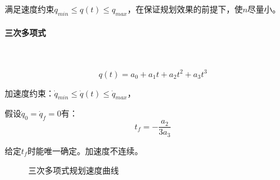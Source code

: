 \documentclass[
12pt, %
a4paper, 
oneside, %
headinclude,footinclude, %
]{scrartcl}
\begin{document}
满足速度约束$ q_{min} \leq q(t) \leq q_{max} $，在保证规划效果的前提下，使$ n $尽量小。
\paragraph{三次多项式}~\\
\begin{minipage}{0.6\textwidth}
$$ q(t) = a_0 + a_1 t + a_2 t^2 + a_3 t^3 $$

\hspace{2em}
加速度约束：$ \dot{q}_{min} \leq \dot{q}(t) \leq \dot{q}_{max} $，

\hspace{2em}
假设$ \dot{q}_0 = \dot{q}_f = 0 $有：
$$ t_f = -\frac{a_2}{3a_3} $$

\hspace{2em}
给定$ t_f $时能唯一确定。加速度不连续。
\end{minipage}
\begin{minipage}{0.4\textwidth}
\begin{figure}[H]
\centering
{}
\caption{三次多项式规划速度曲线}
\end{figure}
\end{minipage}
\end{document}
